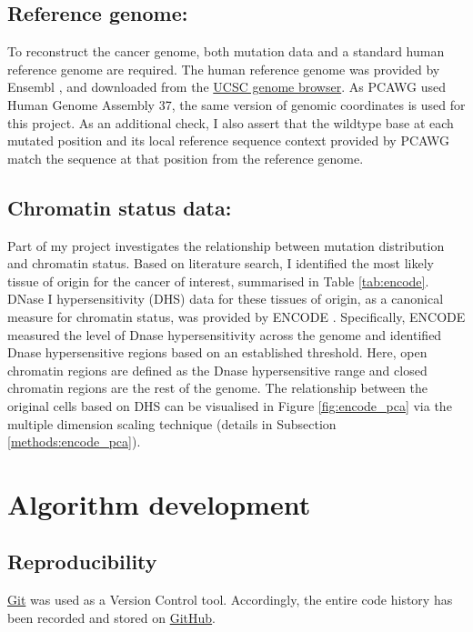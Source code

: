 \subsection{Reference genome:} 
To reconstruct the cancer genome, both mutation data and a standard human reference genome are required. The human reference genome was provided by Ensembl \citep{Yates2020Ensembl2020}, and downloaded from the \href{http://hgdownload.soe.ucsc.edu/goldenPath/hg19/chromosomes}{UCSC genome browser}. As PCAWG used Human Genome Assembly 37, the same version of genomic coordinates is used for this project. As an additional check, I also assert that the wildtype base at each mutated position and its local reference sequence context provided by PCAWG match the sequence at that position from the reference genome. 

\subsection{Chromatin status data:} 
Part of my project investigates the relationship between mutation distribution and chromatin status. Based on literature search, I identified the most likely tissue of origin for the cancer of interest, summarised in Table \ref{tab:encode}. DNase I hypersensitivity (DHS) data for these tissues of origin, as a canonical measure for chromatin status, was provided by ENCODE \citep[downloaded from either \href{https://genome.ucsc.edu/cgi-bin/hgFileUi?db=hg19&g=wgEncodeOpenChromDnase}{Duke} or \href{https://genome.ucsc.edu/cgi-bin/hgFileUi?db=hg19&g=wgEncodeUwDnase}{UW};][]{Thurman2012TheGenome,Klemm2019ChromatinEpigenome}. Specifically, ENCODE measured the level of Dnase hypersensitivity across the genome and identified Dnase hypersensitive regions based on an established threshold. Here, open chromatin regions are defined as the Dnase hypersensitive range and closed chromatin regions are the rest of the genome. The relationship between the original cells based on DHS can be visualised in Figure \ref{fig:encode_pca} via the multiple dimension scaling technique (details in Subsection \ref{methods:encode_pca}). 

\section{Algorithm development}
\subsection{Reproducibility} 
\href{http://git-scm.com}{Git} was used as a Version Control tool. Accordingly, the entire code history has been recorded and stored on \href{https://github.com}{GitHub}.

